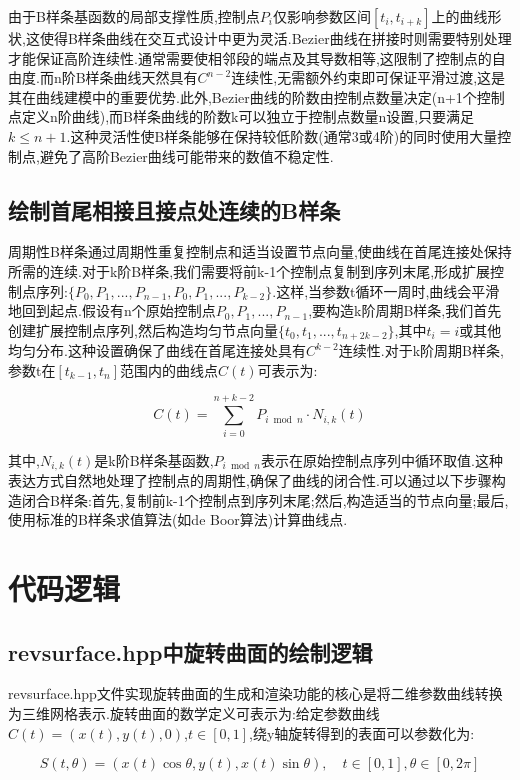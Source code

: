 \documentclass[a4paper,twoside]{article}
\begin{document}
由于B样条基函数的局部支撑性质,控制点$P_i$仅影响参数区间$[t_i, t_{i+k}]$上的曲线形状,这使得B样条曲线在交互式设计中更为灵活.Bezier曲线在拼接时则需要特别处理才能保证高阶连续性.通常需要使相邻段的端点及其导数相等,这限制了控制点的自由度.而n阶B样条曲线天然具有$C^{n-2}$连续性,无需额外约束即可保证平滑过渡,这是其在曲线建模中的重要优势.此外,Bezier曲线的阶数由控制点数量决定(n+1个控制点定义n阶曲线),而B样条曲线的阶数k可以独立于控制点数量n设置,只要满足$k \leq n+1$.这种灵活性使B样条能够在保持较低阶数(通常3或4阶)的同时使用大量控制点,避免了高阶Bezier曲线可能带来的数值不稳定性.

\subsection{绘制首尾相接且接点处连续的B样条}

周期性B样条通过周期性重复控制点和适当设置节点向量,使曲线在首尾连接处保持所需的连续.对于k阶B样条,我们需要将前k-1个控制点复制到序列末尾,形成扩展控制点序列:$\{P_0, P_1, ..., P_{n-1}, P_0, P_1, ..., P_{k-2}\}$.这样,当参数t循环一周时,曲线会平滑地回到起点.假设有n个原始控制点$P_0, P_1, ..., P_{n-1}$,要构造k阶周期B样条,我们首先创建扩展控制点序列,然后构造均匀节点向量$\{t_0, t_1, ..., t_{n+2k-2}\}$,其中$t_i = i$或其他均匀分布.这种设置确保了曲线在首尾连接处具有$C^{k-2}$连续性.对于k阶周期B样条,参数t在$[t_{k-1}, t_n]$范围内的曲线点$C(t)$可表示为:

\begin{equation}
C(t) = \sum_{i=0}^{n+k-2} P_{i \bmod n} \cdot N_{i,k}(t)
\end{equation}

其中,$N_{i,k}(t)$是k阶B样条基函数,$P_{i \bmod n}$表示在原始控制点序列中循环取值.这种表达方式自然地处理了控制点的周期性,确保了曲线的闭合性.可以通过以下步骤构造闭合B样条:首先,复制前k-1个控制点到序列末尾;然后,构造适当的节点向量;最后,使用标准的B样条求值算法(如de Boor算法)计算曲线点.

\section{代码逻辑}
\subsection{revsurface.hpp中旋转曲面的绘制逻辑}
revsurface.hpp文件实现旋转曲面的生成和渲染功能的核心是将二维参数曲线转换为三维网格表示.旋转曲面的数学定义可表示为:给定参数曲线$C(t) = (x(t), y(t), 0)$,$t \in [0,1]$,绕y轴旋转得到的表面可以参数化为:

\begin{equation}
S(t, \theta) = (x(t)\cos\theta, y(t), x(t)\sin\theta), \quad t \in [0,1], \theta \in [0, 2\pi]
\end{equation}
\end{document}
